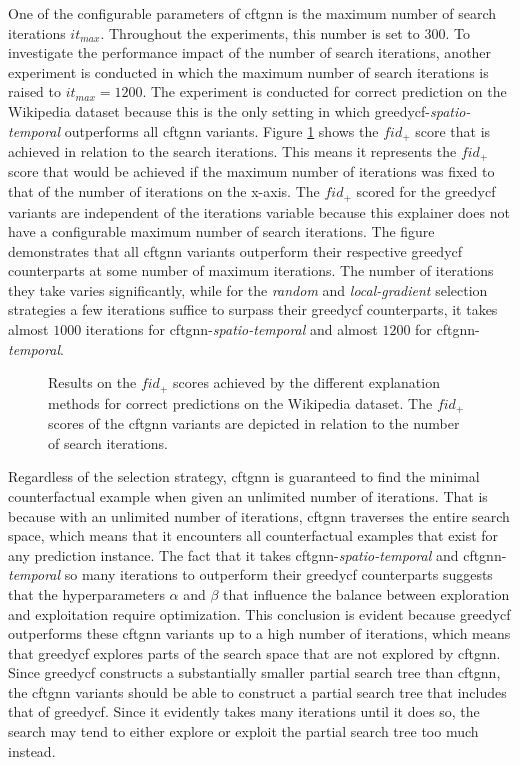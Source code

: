 One of the configurable parameters of \gls{cftgnn} is the maximum number of search iterations $it_{max}$. Throughout the experiments, this number is set to $300$. To investigate the performance impact of the number of search iterations, another experiment is conducted in which the maximum number of search iterations is raised to $it_{max}=1200$. The experiment is conducted for correct prediction on the Wikipedia dataset because this is the only setting in which \gls{greedycf}-\textit{spatio-temporal} outperforms all \gls{cftgnn} variants. Figure \ref{f_fid_iteration} shows the $fid_+$ score that is achieved in relation to the search iterations. This means it represents the $fid_+$ score that would be achieved if the maximum number of iterations was fixed to that of the number of iterations on the x-axis. The $fid_+$ scored for the \gls{greedycf} variants are independent of the iterations variable because this explainer does not have a configurable maximum number of search iterations. 
The figure demonstrates that all \gls{cftgnn} variants outperform their respective \gls{greedycf} counterparts at some number of maximum iterations. The number of iterations they take varies significantly, while for the \textit{random} and \textit{local-gradient} selection strategies a few iterations suffice to surpass their \gls{greedycf} counterparts, it takes almost $1000$ iterations for \gls{cftgnn}-\textit{spatio-temporal} and almost $1200$ for \gls{cftgnn}-\textit{temporal}. 

\begin{figure}[ht]
    \centering
    
    \caption{Results on the $fid_+$ scores achieved by the different explanation methods for correct predictions on the Wikipedia dataset. The $fid_+$ scores of the \gls{cftgnn} variants are depicted in relation to the number of search iterations.}
    \label{f_fid_iteration}
\end{figure}

Regardless of the selection strategy, \gls{cftgnn} is guaranteed to find the minimal counterfactual example when given an unlimited number of iterations. That is because with an unlimited number of iterations, \gls{cftgnn} traverses the entire search space, which means that it encounters all counterfactual examples that exist for any prediction instance. The fact that it takes \gls{cftgnn}-\textit{spatio-temporal} and \gls{cftgnn}-\textit{temporal} so many iterations to outperform their \gls{greedycf} counterparts suggests that the hyperparameters $\alpha$ and $\beta$ that influence the balance between exploration and exploitation require optimization. This conclusion is evident because \gls{greedycf} outperforms these \gls{cftgnn} variants up to a high number of iterations, which means that \gls{greedycf} explores parts of the search space that are not explored by \gls{cftgnn}. Since \gls{greedycf} constructs a substantially smaller partial search tree than \gls{cftgnn}, the \gls{cftgnn} variants should be able to construct a partial search tree that includes that of \gls{greedycf}. Since it evidently takes many iterations until it does so, the search may tend to either explore or exploit the partial search tree too much instead.



